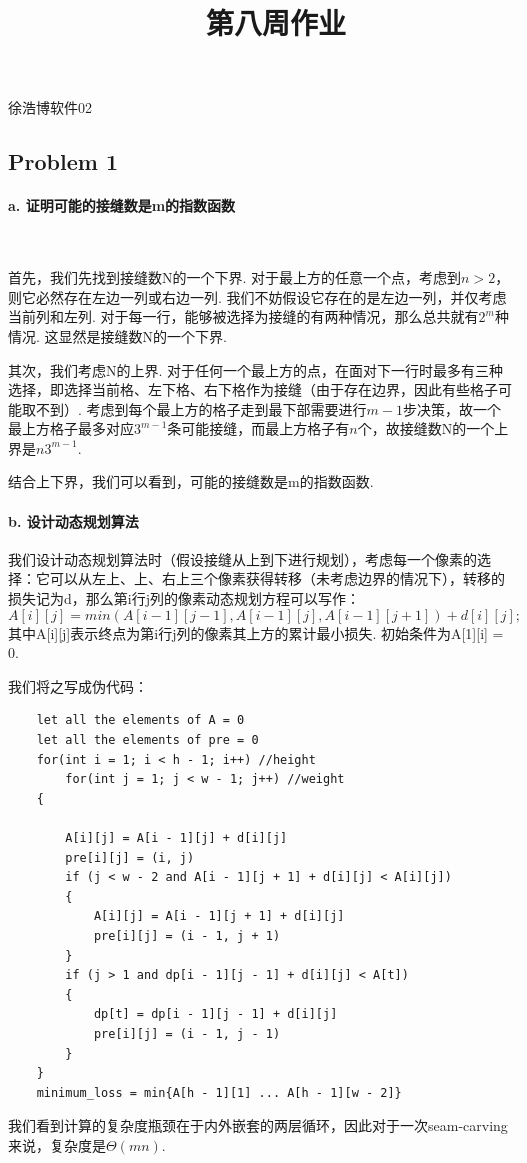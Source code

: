 \documentclass[UTF8]{ctexart}
\begin{document}
\renewcommand{\thefootnote}{\fnsymbol{footnote}}
\linespread{1.4}
\title{\vspace{-5em}\ \ 第八周作业\vspace{-2.5em}}
\date{}
\maketitle
\begin{center}
{\fangsong 徐浩博\quad 软件02}
\end{center}


\subsection*{Problem 1}
\paragraph{a. 证明可能的接缝数是m的指数函数}\  \par
首先，我们先找到接缝数N的一个下界. 对于最上方的任意一个点，考虑到$n>2$，则它必然存在左边一列或右边一列. 我们不妨假设它存在的是左边一列，并仅考虑当前列和左列. 对于每一行，能够被选择为接缝的有两种情况，那么总共就有$2^m$种情况. 这显然是接缝数N的一个下界. \par
其次，我们考虑N的上界. 对于任何一个最上方的点，在面对下一行时最多有三种选择，即选择当前格、左下格、右下格作为接缝（由于存在边界，因此有些格子可能取不到）. 考虑到每个最上方的格子走到最下部需要进行$m-1$步决策，故一个最上方格子最多对应$3^{m-1}$条可能接缝，而最上方格子有$n$个，故接缝数N的一个上界是$n3^{m-1}$.\par
结合上下界，我们可以看到，可能的接缝数是m的指数函数.
\paragraph{b. 设计动态规划算法}  \par
我们设计动态规划算法时（假设接缝从上到下进行规划），考虑每一个像素的选择：它可以从左上、上、右上三个像素获得转移（未考虑边界的情况下），转移的损失记为d，那么第i行j列的像素动态规划方程可以写作：
\[A[i][j] = min(A[i - 1][j - 1], A[i - 1][j], A[i - 1][j + 1]) + d[i][j];\]
其中A[i][j]表示终点为第i行j列的像素其上方的累计最小损失. 初始条件为A[1][i] = 0.\par
我们将之写成伪代码：
\begin{lstlisting}
    let all the elements of A = 0
    let all the elements of pre = 0 
	for(int i = 1; i < h - 1; i++) //height
		for(int j = 1; j < w - 1; j++) //weight
	{
		
		A[i][j] = A[i - 1][j] + d[i][j]
		pre[i][j] = (i, j)
		if (j < w - 2 and A[i - 1][j + 1] + d[i][j] < A[i][j]) 
		{
			A[i][j] = A[i - 1][j + 1] + d[i][j] 
			pre[i][j] = (i - 1, j + 1)
		}
		if (j > 1 and dp[i - 1][j - 1] + d[i][j] < A[t]) 
		{
			dp[t] = dp[i - 1][j - 1] + d[i][j] 
			pre[i][j] = (i - 1, j - 1)
		}
	}
    minimum_loss = min{A[h - 1][1] ... A[h - 1][w - 2]}
\end{lstlisting}
我们看到计算的复杂度瓶颈在于内外嵌套的两层循环，因此对于一次seam-carving来说，复杂度是$\Theta(mn)$.
\end{document}
